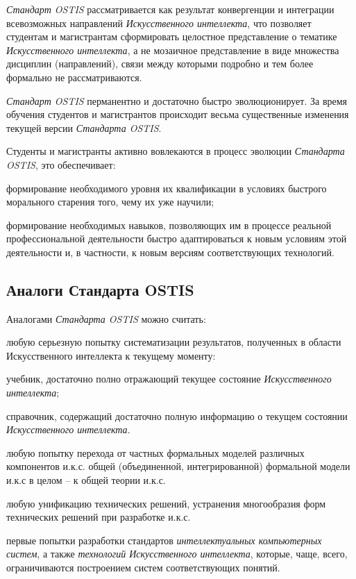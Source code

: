 \textit{Стандарт OSTIS} рассматривается как результат конвергенции и интеграции всевозможных направлений \textit{Искусственного интеллекта}, что позволяет студентам и магистрантам сформировать целостное представление о тематике \textit{Искусственного интеллекта}, а не мозаичное представление в виде множества дисциплин (направлений), связи между которыми подробно и тем более формально не рассматриваются.

\textit{Стандарт OSTIS} перманентно и достаточно быстро эволюционирует. За время обучения студентов и магистрантов происходит весьма существенные изменения текущей версии \textit{Стандарта OSTIS}.

Студенты и магистранты активно вовлекаются в процесс эволюции \textit{Стандарта OSTIS}, это обеспечивает:

\begin{textitemize}
	\item формирование необходимого уровня их квалификации в условиях быстрого морального старения того, чему их уже научили;
	\item формирование необходимых навыков, позволяющих им в процессе реальной профессиональной деятельности быстро адаптироваться к новым условиям этой деятельности и, в частности, к новым версиям соответствующих технологий.
\end{textitemize}


\subsection{Аналоги Стандарта OSTIS}

Аналогами \textit{Стандарта OSTIS} можно считать:

\begin{textitemize}
	\item любую серьезную попытку систематизации результатов, полученных в области Искусственного интеллекта к текущему моменту:
	\begin{textitemize}
		\item учебник, достаточно полно отражающий текущее состояние \textit{Искусственного интеллекта};
		\item справочник, содержащий достаточно полную информацию о текущем состоянии \textit{Искусственного интеллекта}.
	\end{textitemize}
	\item любую попытку перехода от частных формальных моделей различных компонентов и.к.с. общей (объединенной, интегрированной) формальной модели и.к.с в целом -- к общей теории и.к.с.
	\item любую унификацию технических решений, устранения многообразия форм технических решений при разработке и.к.с.
	\item первые попытки разработки стандартов \textit{интеллектуальных компьютерных систем}, а также \textit{технологий Искусственного интеллекта}, которые, чаще, всего, ограничиваются построением систем соответствующих понятий.
\end{textitemize}


